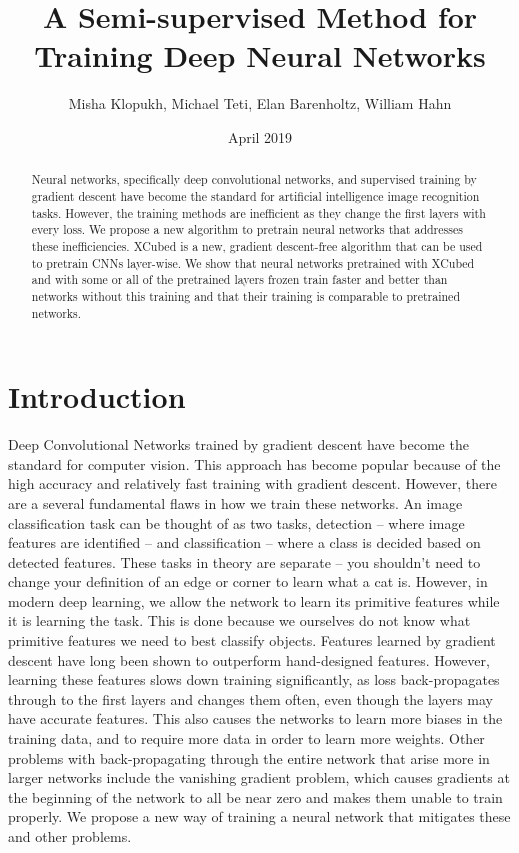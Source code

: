 \documentclass[twocolumn]{article}
\title{A Semi-supervised Method for Training Deep Neural Networks}
\author{Misha Klopukh, Michael Teti, Elan Barenholtz, William Hahn}
\date{April 2019}
\begin{document}
\maketitle




\begin{abstract}
    Neural networks, specifically deep convolutional networks, and supervised training by gradient descent have become the standard for artificial intelligence image recognition tasks. However, the training methods are inefficient as they change the first layers with every loss. We propose a new algorithm to pretrain neural networks that addresses these inefficiencies. XCubed is a new, gradient descent-free algorithm that can be used to pretrain CNNs layer-wise. We show that neural networks pretrained with XCubed and with some or all of the pretrained layers frozen train faster and better than networks without this training and that their training is comparable to pretrained networks.
\end{abstract}

\section{Introduction}

Deep Convolutional Networks trained by gradient descent have become the standard for computer vision. This approach has become popular because of the high accuracy and relatively fast training with gradient descent.\cite{alexnet}\cite{Lecun98gradient} However, there are a several fundamental flaws in how we train these networks. An image classification task can be thought of as two tasks, detection -- where image features are identified -- and classification -- where a class is decided based on detected features. These tasks in theory are separate -- you shouldn't need to change your definition of an edge or corner to learn what a cat is. However, in modern deep learning, we allow the network to learn its primitive features while it is learning the task. This is done because we ourselves do not know what primitive features we need to best classify objects. Features learned by gradient descent have long been shown to outperform hand-designed features.\cite{learnvcraft} However, learning these features slows down training significantly, as loss back-propagates through to the first layers and changes them often, even though the layers may have accurate features. This also causes the networks to learn more biases in the training data, and to require more data in order to learn more weights. Other problems with back-propagating through the entire network that arise more in larger networks include the vanishing gradient problem, which causes gradients at the beginning of the network to all be near zero and makes them unable to train properly.\cite{vanishinggradients}\cite{learningproblems} We propose a new way of training a neural network that mitigates these and other problems.
\end{document}
